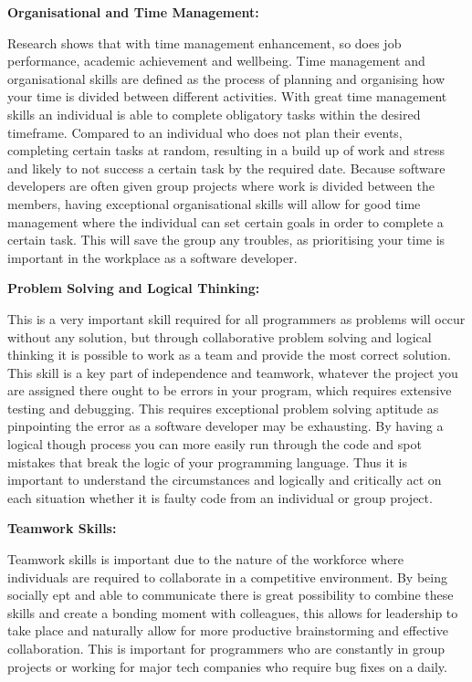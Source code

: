 \documentclass[a4paper, 11pt]{report}
\begin{document}
\textbf{Organisational and Time Management:}
\par Research shows that with time management enhancement, so does job performance, academic achievement and wellbeing. Time management and organisational skills are defined as the process of planning and organising how your time is divided between different activities. With great time management skills an individual is able to complete obligatory tasks within the desired timeframe. Compared to an individual who does not plan their events, completing certain tasks at random, resulting in a build up of work and stress and likely to not success a certain task by the required date. Because software developers are often given group projects where work is divided between the members, having exceptional organisational skills will allow for good time management where the individual can set certain goals in order to complete a certain task. This will save the group any troubles, as prioritising your time is important in the workplace as a software developer.

\bigskip

\textbf{Problem Solving and Logical Thinking:}
\par This is a very important skill required for all programmers as problems will occur without any solution, but through collaborative problem solving and logical thinking it is possible to work as a team and provide the most correct solution. This skill is a key part of independence and teamwork, whatever the project you are assigned there ought to be errors in your program, which requires extensive testing and debugging. This requires exceptional problem solving aptitude as pinpointing the error as a software developer may be exhausting. By having a logical though process you can more easily run through the code and spot mistakes that break the logic of your programming language. Thus it is important to understand the circumstances and logically and critically act on each situation whether it is faulty code from an individual or group project.

\bigskip

\textbf{Teamwork Skills:}
\par Teamwork skills is important due to the nature of the workforce where individuals are required to collaborate in a competitive environment. By being socially ept and able to communicate there is great possibility to combine these skills and create a bonding moment with colleagues, this allows for leadership to take place and naturally allow for more productive brainstorming and effective collaboration. This is important for programmers who are constantly in group projects or working for major tech companies who require bug fixes on a daily.
\end{document}
